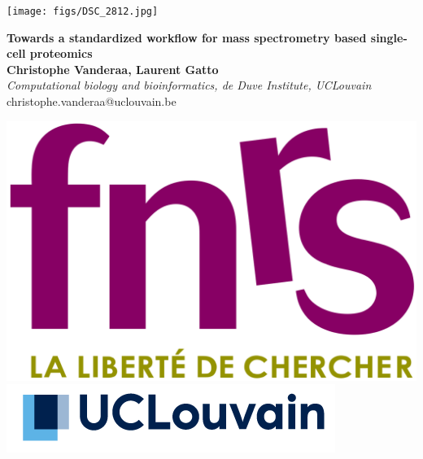 \documentclass{article}
\title{}
\author{}
\date{}
\begin{document}


\begin{center}
\colorbox{lgray}{
  \begin{minipage}{3.7cm}
    \texttt{[image: figs/DSC\_2812.jpg]}
  \end{minipage}
  \begin{minipage}{.72\textwidth}
    \begin{center}
      \vspace{0.4cm}
      \huge 
      \hspace{1cm}
      \noindent
      \textbf{Towards a standardized workflow for mass spectrometry based single-cell proteomics} \\
      \vspace{0.4cm}
      \Large \textbf{Christophe Vanderaa, Laurent Gatto} \\
      \Large \textit{Computational biology and bioinformatics, de Duve Institute, UCLouvain } \\
      \vspace{0.4cm}
      \normalsize christophe.vanderaa@uclouvain.be \\
      \hspace{1cm}
    \end{center}
  \end{minipage}
  \begin{minipage}{3.7cm}
      \includegraphics[width=0.7\linewidth, right]{figs/fnrs.png} \\
      \vspace{0.5cm}
      \includegraphics[width=1.1\linewidth, right]{figs/ucl.png}
  \end{minipage}
}
\end{center}
\end{document}
